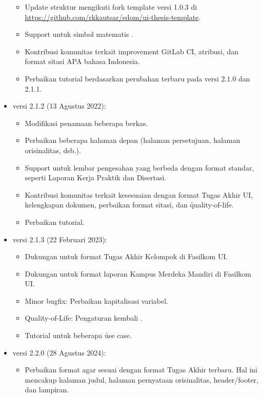 \begin{itemize}
		\begin{itemize}
			\item Update struktur mengikuti fork template versi 1.0.3 di \url{https://github.com/rkkautsar/edom/ui-thesis-template}.
			\item Support untuk simbol matematis .
			\item Kontribusi komunitas terkait improvement GitLab CI, atribusi, dan format sitasi APA bahasa Indonesia.
			\item Perbaikan tutorial berdasarkan perubahan terbaru pada versi 2.1.0 dan 2.1.1.
		\end{itemize}
	\item versi 2.1.2 (13 Agustus 2022):
		\begin{itemize}
			\item Modifikasi penamaan beberapa berkas.
			\item Perbaikan beberapa halaman depan (halaman persetujuan, halaman orisinalitas, dsb.).
			\item Support untuk lembar pengesahan yang berbeda dengan format standar, seperti Laporan Kerja Praktik dan Disertasi.
			\item Kontribusi komunitas terkait kesesuaian dengan format Tugas Akhir UI, kelengkapan dokumen, perbaikan format sitasi, dan \f{quality-of-life}.
			\item Perbaikan tutorial.
		\end{itemize}
	\item versi 2.1.3 (22 Februari 2023):
		\begin{itemize}
			\item Dukungan untuk format Tugas Akhir Kelompok di Fasilkom UI.
			\item Dukungan untuk format laporan Kampus Merdeka Mandiri di Fasilkom UI.
			\item Minor bugfix: Perbaikan kapitalisasi variabel.
			\item Quality-of-Life: Pengaturan kembali .
			\item Tutorial untuk beberapa \f{use case}.
		\end{itemize}
	\item versi 2.2.0 (28 Agustus 2024):
		\begin{itemize}
			\item Perbaikan format agar sesuai dengan format Tugas Akhir terbaru. Hal ini mencakup halaman judul, halaman pernyataan orisinalitas, header/footer, dan lampiran.
		\end{itemize}
\end{itemize}
\clearpage

